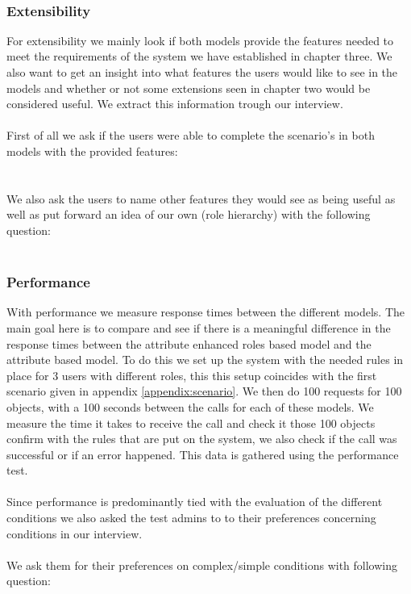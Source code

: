 \textbf{ }
\\
\subsubsection{Extensibility}
For extensibility we mainly look if both models provide the features needed to meet the requirements of the system we have established in chapter three.
We also want to get an insight into what features the users would like to see in the models and whether or not some extensions seen in chapter two would be considered useful.
We extract this information trough our interview.
\\
\\
First of all we ask if the users were able to complete the scenario's in both models with the provided features:
\\

\textbf{ }
\\
\\
We also ask the users to name other features they would see as being useful as well as put forward an idea of our own (role hierarchy) with the following question:
\\

\textbf{ }
\\
\subsubsection{Performance}
With performance we measure response times between the different models. 
The main goal here is to compare and see if there is a meaningful difference in the response times  between the attribute enhanced roles based model and the attribute based model.
To do this we set up the system with the needed rules in place for 3 users with different roles, this this setup coincides with the first scenario given in appendix \ref{appendix:scenario}.
We then do 100 requests for 100 objects, with a 100 seconds between the calls for each of these models.
We measure the time it takes to receive the call and check it those 100 objects confirm with the rules that are put on the system, we also check if the call was successful or if an error happened.
This data is gathered using the performance test.
\\
\\
Since performance is predominantly tied with the evaluation of the different conditions we also asked the test admins to to their preferences concerning conditions in our interview.
\\
\\
We ask them for their preferences on complex/simple conditions with following question:
\\

